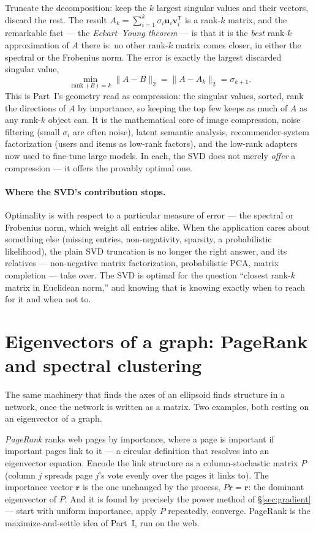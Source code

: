 \documentclass[11pt]{article}
\numberwithin{equation}{section}
\newcommand{\T}{^{\mathsf{T}}}
\newcommand{\vv}[1]{\mathbf{v}_{#1}}
\newcommand{\uu}[1]{\mathbf{u}_{#1}}
\theoremstyle{plainish}
\begin{document}
Truncate the decomposition: keep the $k$ largest singular values and their
vectors, discard the rest. The result $A_k = \sum_{i=1}^k \sigma_i \uu i \vv i\T$
is a rank-$k$ matrix, and the remarkable fact --- the \emph{Eckart--Young
theorem} --- is that it is the \emph{best} rank-$k$ approximation of $A$ there is:
no other rank-$k$ matrix comes closer, in either the spectral or the Frobenius
norm. The error is exactly the largest discarded singular value,
\begin{equation}\min_{\operatorname{rank}(B) = k} \|A - B\|_2 = \|A - A_k\|_2 = \sigma_{k+1}.
\end{equation}
This is Part~I's geometry read as compression: the singular values, sorted, rank
the directions of $A$ by importance, so keeping the top few keeps as much of $A$
as any rank-$k$ object can. It is the mathematical core of image compression,
noise filtering (small $\sigma_i$ are often noise), latent semantic analysis,
recommender-system factorization (users and items as low-rank factors), and the
low-rank adapters now used to fine-tune large models. In each, the SVD does not
merely \emph{offer} a compression --- it offers the provably optimal one.

\paragraph{Where the SVD's contribution stops.} Optimality is with respect to a
particular measure of error --- the spectral or Frobenius norm, which weight all
entries alike. When the application cares about something else (missing entries,
non-negativity, sparsity, a probabilistic likelihood), the plain SVD truncation
is no longer the right answer, and its relatives --- non-negative matrix
factorization, probabilistic PCA, matrix completion --- take over. The SVD is
optimal for the question ``closest rank-$k$ matrix in Euclidean norm,'' and
knowing that is knowing exactly when to reach for it and when not to.

\section{Eigenvectors of a graph: PageRank and spectral clustering}
\label{sec:graph}

The same machinery that finds the axes of an ellipsoid finds structure in a
network, once the network is written as a matrix. Two examples, both resting on
an eigenvector of a graph.

\emph{PageRank} ranks web pages by importance, where a page is important if
important pages link to it --- a circular definition that resolves into an
eigenvector equation. Encode the link structure as a column-stochastic matrix
$P$ (column $j$ spreads page $j$'s vote evenly over the pages it links to). The
importance vector $\mathbf{r}$ is the one unchanged by the process,
$P\mathbf{r} = \mathbf{r}$: the dominant eigenvector of $P$. And it is found by
precisely the power method of \S\ref{sec:gradient} --- start with uniform
importance, apply $P$ repeatedly, converge. PageRank is the maximize-and-settle
idea of Part~I, run on the web.
\end{document}
